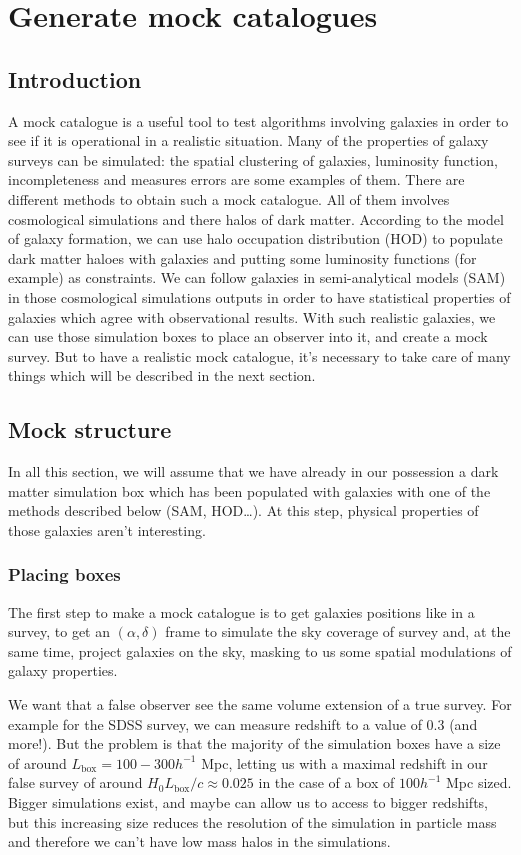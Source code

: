 \chapter{Generate mock catalogues}
%
\section{Introduction}
%
A mock catalogue is a useful tool to test algorithms involving galaxies in
order to see if it is operational in a realistic situation. Many of the
properties of galaxy surveys can be simulated: the spatial clustering of
galaxies, luminosity function, incompleteness and measures errors are some
examples of them. There are different methods to obtain such a mock catalogue.
All of them involves cosmological simulations and there halos of dark matter.
According to the model of galaxy formation, we can use halo occupation
distribution (HOD) to populate dark matter haloes with galaxies and putting
some luminosity functions (for example) as constraints. We can follow galaxies
in semi-analytical models (SAM) in those cosmological simulations outputs in
order to have statistical properties of galaxies which agree with observational
results. With such realistic galaxies, we can use those simulation boxes to
place an observer into it, and create a mock survey. But to have a realistic
mock catalogue, it's necessary to take care of many things which will be
described in the next section.
%
\section{Mock structure}
%
In all this section, we will assume that we have already in our possession a
dark matter simulation box which has been populated with galaxies with one of
the methods described below (SAM, HOD\ldots). At this step, physical properties
of those galaxies aren't interesting.
%
\subsection{Placing boxes}
%
The first step to make a mock catalogue is to get galaxies positions like in a
survey, to get an $(\alpha,\delta)$ frame to simulate the sky coverage of
survey and, at the same time, project galaxies on the sky, masking to us some
spatial modulations of galaxy properties.

We want that a false observer see the same volume extension of a true survey.
For example for the SDSS survey, we can measure redshift to a value of 0.3 (and
more!). But the problem is that the majority of the simulation boxes have a
size of around $L_{\mathrm{box}}=100-300 h^{-1}$ Mpc, letting us with a maximal
redshift in our false survey of around ${H_0}{L_{\mathrm{box}}}/c\approx 0.025$
in the case of a box of $100 h^{-1}$ Mpc sized. Bigger simulations exist, and
maybe can allow us to access to bigger redshifts, but this increasing size
reduces the resolution of the simulation in particle mass and therefore we
can't have low mass halos in the simulations.

